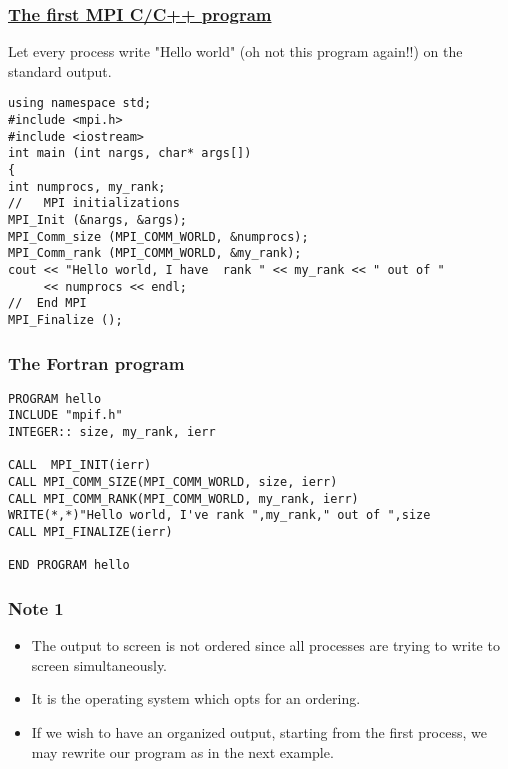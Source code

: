 \documentclass{beamer}
\begin{document}
\begin{frame}
\frametitle{\href{{https://github.com/CompPhysics/ComputationalPhysics2/blob/gh-pages/doc/Programs/LecturePrograms/programs/MPI/chapter07/program2.cpp}}{The first MPI C/C++ program}}

\begin{block}{}


Let every process write "Hello world" (oh not this program again!!) on the standard output. 
\begin{verbatim}
using namespace std;
#include <mpi.h>
#include <iostream>
int main (int nargs, char* args[])
{
int numprocs, my_rank;
//   MPI initializations
MPI_Init (&nargs, &args);
MPI_Comm_size (MPI_COMM_WORLD, &numprocs);
MPI_Comm_rank (MPI_COMM_WORLD, &my_rank);
cout << "Hello world, I have  rank " << my_rank << " out of " 
     << numprocs << endl;
//  End MPI
MPI_Finalize ();
\end{verbatim}

\end{block}
\end{frame}

\begin{frame}
\frametitle{The Fortran program}

\begin{block}{}
\begin{Verbatim}[numbers=none,fontsize=\fontsize{9pt}{9pt},baselinestretch=0.95]
PROGRAM hello
INCLUDE "mpif.h"
INTEGER:: size, my_rank, ierr

CALL  MPI_INIT(ierr)
CALL MPI_COMM_SIZE(MPI_COMM_WORLD, size, ierr)
CALL MPI_COMM_RANK(MPI_COMM_WORLD, my_rank, ierr)
WRITE(*,*)"Hello world, I've rank ",my_rank," out of ",size
CALL MPI_FINALIZE(ierr)

END PROGRAM hello
\end{Verbatim}


\end{block}
\end{frame}

\begin{frame}
\frametitle{Note 1}

\begin{block}{}

\begin{itemize}
\item The output to screen is not ordered since all processes are trying to write  to screen simultaneously.

\item It is the operating system which opts for an ordering.  

\item If we wish to have an organized output, starting from the first process, we may rewrite our program as in the next example.
\end{itemize}

\noindent
\end{block}
\end{frame}
\end{document}
